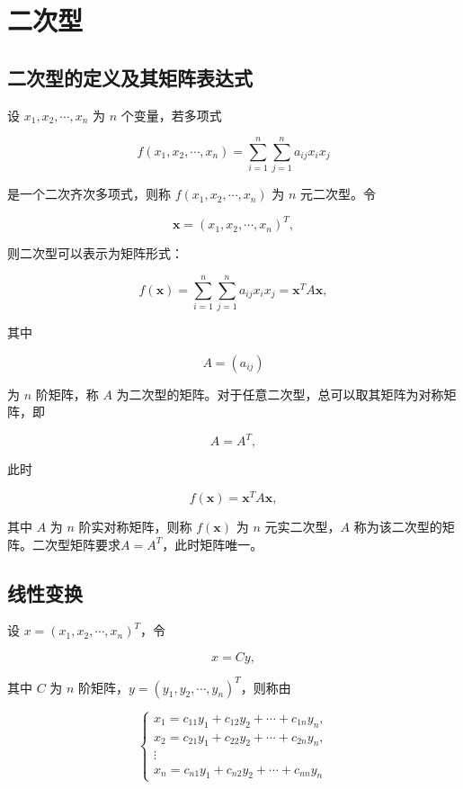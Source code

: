 \documentclass[./linear_algebra.tex]{subfiles}
\begin{document}
    \section{二次型}

    \subsection{二次型的定义及其矩阵表达式}

    设 $x_1,x_2,\cdots,x_n$ 为 $n$ 个变量，若多项式

    \[
        f(x_1,x_2,\cdots,x_n) = \sum_{i=1}^{n}\sum_{j=1}^{n}a_{ij}x_ix_j
    \]

    \noindent
    是一个二次齐次多项式，则称 $f(x_1,x_2,\cdots,x_n)$ 为 $n$ 元二次型。令

    \[
        \boldsymbol{x} = (x_1,x_2,\cdots,x_n)^T,
    \]

    \noindent
    则二次型可以表示为矩阵形式：

    \[
        f(\boldsymbol{x}) = \sum_{i=1}^{n}\sum_{j=1}^{n}a_{ij}x_ix_j = \boldsymbol{x}^{T}A\boldsymbol{x},
    \]

    \noindent
    其中

    \[
        A=(a_{ij})
    \]

    \noindent
    为 $n$ 阶矩阵，称 $A$ 为二次型的矩阵。对于任意二次型，总可以取其矩阵为对称矩阵，即

    \[
        A=A^T,
    \]

    \noindent
    此时

    \[
        f(\boldsymbol{x})
        =
        \boldsymbol{x}^{T}A\boldsymbol{x},
    \]

    \noindent
    其中 $A$ 为 $n$ 阶实对称矩阵，则称 $f(\boldsymbol{x})$ 为 $n$ 元实二次型，$A$ 称为该二次型的矩阵。二次型矩阵要求$A=A^T$，此时矩阵唯一。{\color{red}{系数矩阵$A$的秩即为二次型$f(x)$的秩}}

    \subsection{线性变换}


    设 $x=(x_1,x_2,\cdots,x_n)^T$，令

    \[
        x=Cy,
    \]

    \noindent
    其中 $C$ 为 $n$ 阶矩阵，$y=(y_1,y_2,\cdots,y_n)^T$，则称由

    \[
        \begin{cases}
            x_1=c_{11}y_1+c_{12}y_2+\cdots+c_{1n}y_n,\\
            x_2=c_{21}y_1+c_{22}y_2+\cdots+c_{2n}y_n,\\
            \vdots\\
            x_n=c_{n1}y_1+c_{n2}y_2+\cdots+c_{nn}y_n
        \end{cases}
    \]
\end{document}
